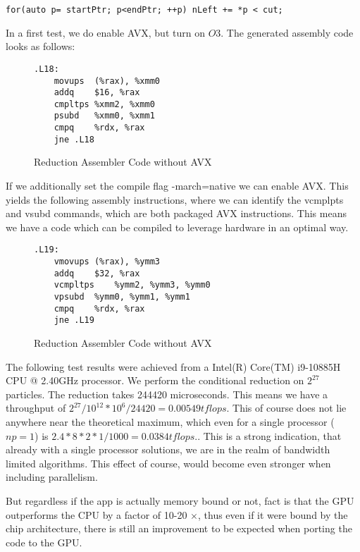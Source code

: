 \documentclass[]{article}
\begin{document}
\begin{lstlisting}
for(auto p= startPtr; p<endPtr; ++p) nLeft += *p < cut;
\end{lstlisting}

In a first test, we do enable AVX, but turn on $O3$. The generated assembly code looks as follows:

\begin{figure}
	\begin{lstlisting}
.L18:
	movups	(%rax), %xmm0
	addq	$16, %rax
	cmpltps	%xmm2, %xmm0
	psubd	%xmm0, %xmm1
	cmpq	%rdx, %rax
	jne	.L18

	\end{lstlisting}
\caption{Reduction Assembler Code without AVX}
\label{fig:assembler}
\end{figure}

If we additionally set the compile flag -march=native we can enable AVX. This yields the following assembly instructions, where we can identify the vcmplpts and vsubd commands, which are both packaged AVX instructions. This means we have a code which can be compiled to leverage hardware in an optimal way.

\begin{figure}
\begin{lstlisting}
.L19:
	vmovups	(%rax), %ymm3
	addq	$32, %rax
	vcmpltps	%ymm2, %ymm3, %ymm0
	vpsubd	%ymm0, %ymm1, %ymm1
	cmpq	%rdx, %rax
	jne	.L19	

\end{lstlisting}
\caption{Reduction Assembler Code without AVX}
\label{fig:assembler-avx}
\end{figure}

The following test results were achieved from a Intel(R) Core(TM) i9-10885H CPU @ 2.40GHz
processor. We perform the conditional reduction on  $2^{27}$ particles. The reduction takes 244420 microseconds. This means we have a throughput of $2^{27} / 10^{12} * 10^6 / 24420 = 0.00549 tflops$. This of course does not lie anywhere near the theoretical maximum, which even for a single processor ($np = 1$) is $2.4 * 8 * 2 * 1 / 1000 = 0.0384 tflops.$. This is a strong indication, that already with a single processor solutions, we are in the realm of bandwidth limited algorithms. This effect of course, would become even stronger when including parallelism.

But regardless if the app is actually memory bound or not, fact is that the GPU outperforms the CPU by a factor of 10-20 $\times$, thus even if it were bound by the chip architecture, there is still an improvement to be expected when porting the code to the GPU. 
\end{document}

